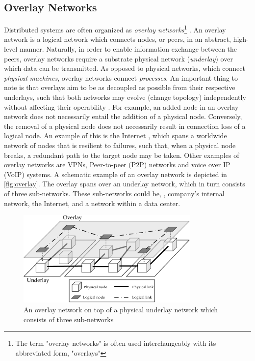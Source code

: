 \subsection{Overlay Networks}
Distributed systems are often organized as \emph{overlay networks}\footnote{The term "overlay networks" is often used interchangeably with its abbreviated form, "overlays"} \cite{tarkoma2010overlay}. An overlay network is a logical network which connects nodes, or peers, in an abstract, high-level manner. Naturally, in order to enable information exchange between the peers, overlay networks require a substrate physical network (\emph{underlay}) over which data can be transmitted. As opposed to physical networks, which connect \emph{physical machines}, overlay networks connect \emph{processes}. An important thing to note is that overlays aim to be as decoupled as possible from their respective underlays, such that both networks may evolve (change topology) independently without affecting their operability \cite{tanenbaum2017distributed}. For example, an added node in an overlay network does not necessarily entail the addition of a physical node. Conversely, the removal of a physical node does not necessarily result in connection loss of a logical node. An example of this is the Internet \cite{vaezi2017virtualization}, which spans a worldwide network of nodes that is resilient to failures, such that, when a physical node breaks, a redundant path to the target node may be taken. Other examples of overlay networks are VPNs, Peer-to-peer (P2P) networks and voice over IP (VoIP) systems. A schematic example of an overlay network is depicted in \autoref{fig:overlay}. The overlay spans over an underlay network, which in turn consists of three sub-networks. These sub-networks could be, \eg , company's internal network, the Internet, and a network within a data center. 

\begin{figure}[htpb]
  \centering
  \includegraphics[width=0.8\textwidth]{figures/overlay.pdf}
  \caption[Overlay networking concept]{An overlay network on top of a physical underlay network which consists of three sub-networks}\label{fig:overlay}
\end{figure}

